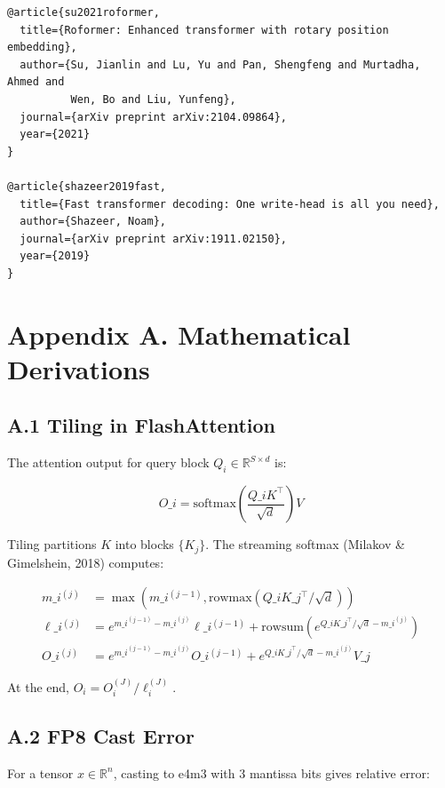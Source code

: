 \begin{lstlisting}
@article{su2021roformer,
  title={Roformer: Enhanced transformer with rotary position embedding},
  author={Su, Jianlin and Lu, Yu and Pan, Shengfeng and Murtadha, Ahmed and 
          Wen, Bo and Liu, Yunfeng},
  journal={arXiv preprint arXiv:2104.09864},
  year={2021}
}

@article{shazeer2019fast,
  title={Fast transformer decoding: One write-head is all you need},
  author={Shazeer, Noam},
  journal={arXiv preprint arXiv:1911.02150},
  year={2019}
}
\end{lstlisting}




\section{Appendix A. Mathematical Derivations}

\subsection{A.1 Tiling in FlashAttention}

The attention output for query block $Q_i \in \mathbb{R}^{S \times d}$ is:

\[
O\_i = \text{softmax}\!\left(\frac{Q\_i K^\top}{\sqrt{d}}\right) V
\tag{A.1}
\]

Tiling partitions $K$ into blocks $\{K_j\}$. The streaming softmax (Milakov 
\& Gimelshein, 2018) computes:

\[
\begin{aligned}
m\_i^{(j)} &= \max(m\_i^{(j-1)}, \text{rowmax}(Q\_i K\_j^\top / \sqrt{d})) \\
\ell\_i^{(j)} &= e^{m\_i^{(j-1)} - m\_i^{(j)}} \ell\_i^{(j-1)} 
              + \text{rowsum}(e^{Q\_i K\_j^\top / \sqrt{d} - m\_i^{(j)}}) \\
O\_i^{(j)} &= e^{m\_i^{(j-1)} - m\_i^{(j)}} O\_i^{(j-1)} 
          + e^{Q\_i K\_j^\top / \sqrt{d} - m\_i^{(j)}} V\_j
\end{aligned}
\tag{A.2}
\]

At the end, $O_i = O_i^{(J)} / \ell_i^{(J)}$.

\subsection{A.2 FP8 Cast Error}

For a tensor $x \in \mathbb{R}^n$, casting to e4m3 with 3 mantissa bits gives 
relative error:

